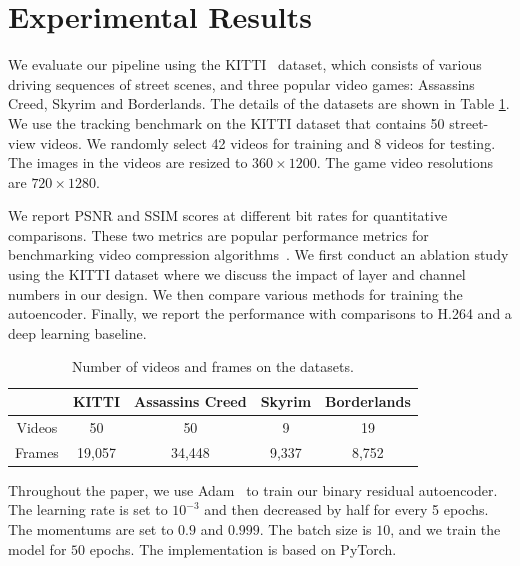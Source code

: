 \documentclass[letterpaper]{article} %
\begin{document}
	\section{Experimental Results}

	We evaluate our pipeline using the KITTI~\cite{Geiger_CVPR_2012} dataset, which consists of various driving sequences of street scenes, and three popular video games: Assassins Creed, Skyrim and Borderlands. The details of the datasets are shown in Table \ref{tab:dataset}. We use the tracking benchmark on the KITTI dataset that contains 50 street-view videos. We randomly select 42 videos for training and 8 videos for testing. The images in the videos are resized to $360 \times 1200$. The game video resolutions are $720 \times 1280$.

	We report PSNR and SSIM scores at different bit rates for quantitative comparisons. These two metrics are popular performance metrics for benchmarking video compression algorithms~\cite{Wang_TIP_2004}. We first conduct an ablation study using the KITTI dataset where we discuss the impact of layer and channel numbers in our design. We then compare various methods for training the autoencoder. Finally, we report the performance with comparisons to H.264 and a deep learning baseline.
	\begin{table}[t]
		\caption{Number of videos and frames on the datasets.
		}
		\small
		\centering
		\begin{tabular}{ccccc}
			\toprule
			& KITTI & Assassins Creed & Skyrim & Borderlands \\
			\hline

			Videos & 50 & 50 & 9 & 19 \\
			\hline

			Frames & 19,057 & 34,448 & 9,337 & 8,752\\
			\bottomrule
		\end{tabular}
		\label{tab:dataset}
	\end{table}
	{} Throughout the paper, we use Adam~\cite{Kingma_ICLR_2015} to train our binary residual autoencoder. The learning rate is set to $10^{-3}$ and then decreased by half for every 5 epochs. The momentums are set to $0.9$ and $0.999$. The batch size is $10$, and we train the model for $50$ epochs. The implementation is based on PyTorch.
\end{document}

